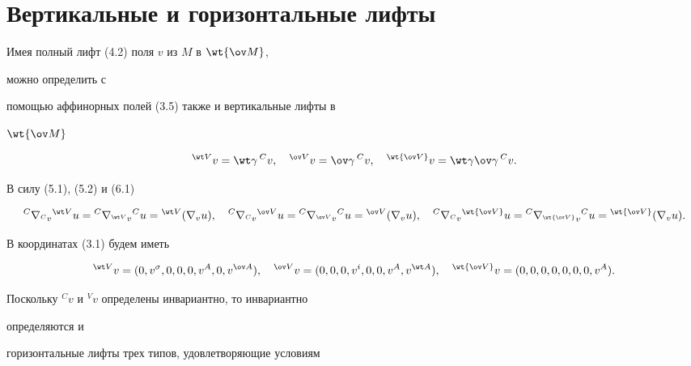 \section{Вертикальные и горизонтальные лифты}





Имея полный лифт (4.2) поля $v$ из $M$ в $\wt{\ov M}$,


можно определить с


помощью аффинорных полей (3.5) также и вертикальные лифты в


$\wt{\ov M}$


\begin{equation}


{}^{\wt V}v=\wt\gamma\,{}^Cv,\quad


{}^{\ov V}v=\ov\gamma\,{}^Cv,\quad


{}^{\wt{\ov V}}v=\wt\gamma\ov\gamma\,{}^C v.


\end{equation}


В силу (5.1), (5.2) и (6.1)


$$


{}^C\nabla_{{}^C v}{}^{\wt V}u=


{}^C\nabla_{{}^{\wt V}v}{}^C u={}^{\wt V}(\nabla_v u),\quad


{}^C\nabla_{{}^C v}{}^{\ov V}u={}^C\nabla_{{}^{\ov V}v}


{}^C u={}^{\ov V}(\nabla_v u),\quad


{}^C\nabla_{{}^C v}{}^{\wt{\ov V}}u=


{}^C\nabla_{{}^{\wt{\ov V}}v}{}^C u=


{}^{\wt{\ov V}}(\nabla_v u).


$$


В координатах (3.1) будем иметь


\begin{equation}


{}^{\wt V}v=(0,v^\sigma,0,0,0,v^A,0,v^{\ov A}),\quad


{}^{\ov V}v=(0,0,0,v^i,0,0,v^A,v^{\wt A}),\quad


{}^{\wt{\ov V}}v=(0,0,0,0,0,0,0,v^A).


\end{equation}


Поскольку ${}^C v$ и ${}^V v$ определены инвариантно, то инвариантно


определяются и


горизонтальные лифты трех типов, удовлетворяющие условиям


